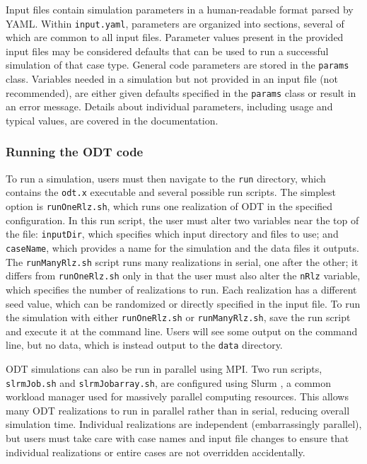 \documentclass[preprint,12pt, a4paper]{elsarticle}
\begin{document}
Input files contain simulation parameters in a human-readable format parsed by YAML. Within \texttt{input.yaml}, parameters are organized into sections, several of which are common to all input files. Parameter values present in the provided input files may be considered defaults that can be used to run a successful simulation of that case type. General code parameters are stored in the \texttt{params} class. Variables needed in a simulation but not provided in an input file (not recommended), are either given defaults specified in the \texttt{params} class or result in an error message. Details about individual parameters, including usage and typical values, are covered in the documentation.

\subsubsection{Running the ODT code}

To run a simulation, users must then navigate to the \texttt{run} directory, which contains the \texttt{odt.x} executable and several possible run scripts. The simplest option is \texttt{runOneRlz.sh}, which runs one realization of ODT in the specified configuration. In this run script, the user must alter two variables near the top of the file: \texttt{inputDir}, which specifies which input directory and files to use; and \texttt{caseName}, which provides a name for the simulation and the data files it outputs. The \texttt{runManyRlz.sh} script runs many realizations in serial, one after the other; it differs from \texttt{runOneRlz.sh} only in that the user must also alter the \texttt{nRlz} variable, which specifies the number of realizations to run. Each realization has a different seed value, which can be randomized or directly specified in the input file. To run the simulation with either \texttt{runOneRlz.sh} or \texttt{runManyRlz.sh}, save the run script and execute it at the command line. Users will see some output on the command line, but no data, which is instead output to the \texttt{data} directory.  

ODT simulations can also be run in parallel using MPI. Two run scripts, \texttt{slrmJob.sh} and \texttt{slrmJob\textunderscore array.sh}, are configured using Slurm \cite{Yoo_2003}, a common workload manager used for massively parallel computing resources. This allows many ODT realizations to run in parallel rather than in serial, reducing overall simulation time. Individual realizations are independent (embarrassingly parallel), but users must take care with case names and input file changes to ensure that individual realizations or entire cases are not overridden accidentally. 
\end{document}
